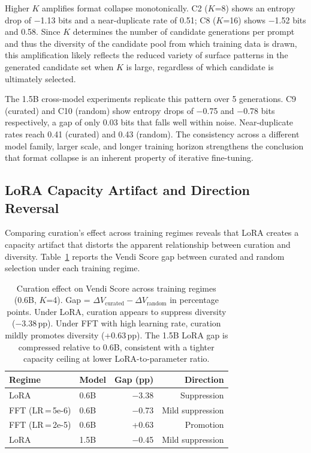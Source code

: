 \documentclass[11pt,a4paper]{article}
\begin{document}
Higher $K$ amplifies format collapse monotonically. C2 ($K$=8) shows an entropy drop of $-$1.13 bits and a near-duplicate rate of 0.51; C8 ($K$=16) shows $-$1.52 bits and 0.58. Since $K$ determines the number of candidate generations per prompt and thus the diversity of the candidate pool from which training data is drawn, this amplification likely reflects the reduced variety of surface patterns in the generated candidate set when $K$ is large, regardless of which candidate is ultimately selected.

The 1.5B cross-model experiments replicate this pattern over 5 generations. C9 (curated) and C10 (random) show entropy drops of $-$0.75 and $-$0.78 bits respectively, a gap of only 0.03 bits that falls well within noise. Near-duplicate rates reach 0.41 (curated) and 0.43 (random). The consistency across a different model family, larger scale, and longer training horizon strengthens the conclusion that format collapse is an inherent property of iterative fine-tuning.

\subsection{LoRA Capacity Artifact and Direction Reversal}
\label{sec:lora}

Comparing curation's effect across training regimes reveals that LoRA creates a capacity artifact that distorts the apparent relationship between curation and diversity. Table~\ref{tab:gap} reports the Vendi Score gap between curated and random selection under each training regime.

\begin{table}[t]
\centering
\caption{Curation effect on Vendi Score across training regimes (0.6B, $K$=4). Gap = $\Delta V_{\text{curated}} - \Delta V_{\text{random}}$ in percentage points. Under LoRA, curation appears to suppress diversity ($-$3.38\,pp). Under FFT with high learning rate, curation mildly promotes diversity (+0.63\,pp). The 1.5B LoRA gap is compressed relative to 0.6B, consistent with a tighter capacity ceiling at lower LoRA-to-parameter ratio.}
\label{tab:gap}
\footnotesize
\begin{tabular}{llrr}
\toprule
Regime & Model & Gap (pp) & Direction \\
\midrule
LoRA & 0.6B & $-$3.38 & Suppression \\
FFT (LR\,=\,5e-6) & 0.6B & $-$0.73 & Mild suppression \\
FFT (LR\,=\,2e-5) & 0.6B & +0.63 & Promotion \\
\midrule
LoRA & 1.5B & $-$0.45 & Mild suppression \\
\bottomrule
\end{tabular}
\end{table}
\end{document}
